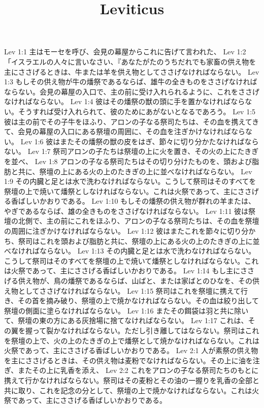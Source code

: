 

\title{Leviticus}

Lev 1:1  主はモーセを呼び、会見の幕屋からこれに告げて言われた、
Lev 1:2  「イスラエルの人々に言いなさい、『あなたがたのうちだれでも家畜の供え物を主にささげるときは、牛または羊を供え物としてささげなければならない。
Lev 1:3  もしその供え物が牛の燔祭であるならば、雄牛の全きものをささげなければならない。会見の幕屋の入口で、主の前に受け入れられるように、これをささげなければならない。
Lev 1:4  彼はその燔祭の獣の頭に手を置かなければならない。そうすれば受け入れられて、彼のためにあがないとなるであろう。
Lev 1:5  彼は主の前でその子牛をほふり、アロンの子なる祭司たちは、その血を携えてきて、会見の幕屋の入口にある祭壇の周囲に、その血を注ぎかけなければならない。
Lev 1:6  彼はまたその燔祭の獣の皮をはぎ、節々に切り分かたなければならない。
Lev 1:7  祭司アロンの子たちは祭壇の上に火を置き、その火の上にたきぎを並べ、
Lev 1:8  アロンの子なる祭司たちはその切り分けたものを、頭および脂肪と共に、祭壇の上にある火の上のたきぎの上に並べなければならない。
Lev 1:9  その内臓と足とは水で洗わなければならない。こうして祭司はそのすべてを祭壇の上で焼いて燔祭としなければならない。これは火祭であって、主にささげる香ばしいかおりである。
Lev 1:10  もしその燔祭の供え物が群れの羊または、やぎであるならば、雄の全きものをささげなければならない。
Lev 1:11  彼は祭壇の北側で、主の前にこれをほふり、アロンの子なる祭司たちは、その血を祭壇の周囲に注ぎかけなければならない。
Lev 1:12  彼はまたこれを節々に切り分かち、祭司はこれを頭および脂肪と共に、祭壇の上にある火の上のたきぎの上に並べなければならない。
Lev 1:13  その内臓と足とは水で洗わなければならない。こうして祭司はそのすべてを祭壇の上で焼いて燔祭としなければならない。これは火祭であって、主にささげる香ばしいかおりである。
Lev 1:14  もし主にささげる供え物が、鳥の燔祭であるならば、山ばと、または家ばとのひなを、その供え物としてささげなければならない。
Lev 1:15  祭司はこれを祭壇に携えて行き、その首を摘み破り、祭壇の上で焼かなければならない。その血は絞り出して祭壇の側面に塗らなければならない。
Lev 1:16  またその餌袋は羽と共に除いて、祭壇の東の方にある灰捨場に捨てなければならない。
Lev 1:17  これは、その翼を握って裂かなければならない。ただし引き離してはならない。祭司はこれを祭壇の上で、火の上のたきぎの上で燔祭として焼かなければならない。これは火祭であって、主にささげる香ばしいかおりである。
Lev 2:1  人が素祭の供え物を主にささげるときは、その供え物は麦粉でなければならない。その上に油を注ぎ、またその上に乳香を添え、
Lev 2:2  これをアロンの子なる祭司たちのもとに携えて行かなければならない。祭司はその麦粉とその油の一握りを乳香の全部と共に取り、これを記念の分として、祭壇の上で焼かなければならない。これは火祭であって、主にささげる香ばしいかおりである。
